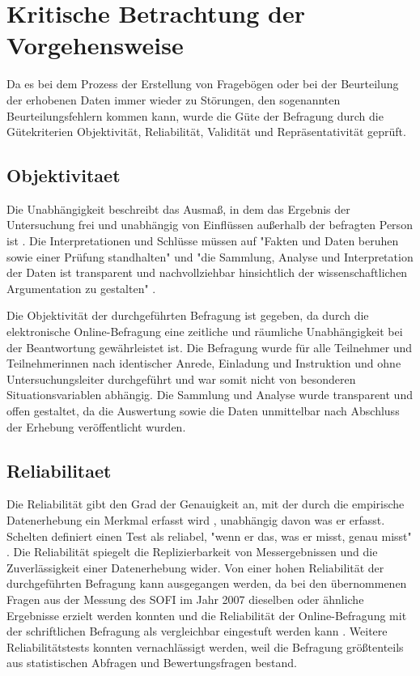 \section{Kritische Betrachtung der Vorgehensweise}

Da es bei dem Prozess der Erstellung von Fragebögen oder bei der Beurteilung der erhobenen Daten immer wieder zu Störungen, den sogenannten Beurteilungsfehlern kommen kann, wurde die Güte der Befragung durch die Gütekriterien Objektivität, Reliabilität, Validität und Repräsentativität geprüft.

\subsection{Objektivitaet}

Die Unabhängigkeit beschreibt das Ausmaß, in dem das Ergebnis der Untersuchung frei und unabhängig von Einflüssen außerhalb der befragten Person ist \cite{rost_2004_lehrbuch}. Die Interpretationen und Schlüsse müssen auf "Fakten und Daten beruhen sowie einer Prüfung standhalten" und "die Sammlung, Analyse und Interpretation der Daten ist transparent und nachvollziehbar hinsichtlich der wissenschaftlichen Argumentation zu gestalten" \cite{Bargheer_2015}.

Die Objektivität der durchgeführten Befragung ist gegeben, da durch die elektronische Online-Befragung eine zeitliche und räumliche Unabhängigkeit bei der Beantwortung gewährleistet ist. Die Befragung wurde für alle Teilnehmer und Teilnehmerinnen nach identischer Anrede, Einladung und Instruktion und ohne Untersuchungsleiter durchgeführt und war somit nicht von besonderen Situationsvariablen abhängig. Die Sammlung und Analyse wurde transparent und offen gestaltet, da die Auswertung sowie die Daten unmittelbar nach Abschluss der Erhebung veröffentlicht wurden.

\subsection{Reliabilitaet}

Die Reliabilität gibt den Grad der Genauigkeit an, mit der durch die empirische Datenerhebung ein Merkmal erfasst wird \cite{rost_2004_lehrbuch}, unabhängig davon was er erfasst. Schelten definiert einen Test als reliabel, "wenn er das, was er misst, genau misst" \cite{schelten_1997_testbeurteilung}. Die Reliabilität spiegelt die Replizierbarkeit von Messergebnissen und die Zuverlässigkeit einer Datenerhebung wider. Von einer hohen Reliabilität der durchgeführten Befragung kann ausgegangen werden, da bei den übernommenen Fragen aus der Messung des SOFI im Jahr 2007 dieselben oder ähnliche Ergebnisse erzielt werden konnten und die Reliabilität der Online-Befragung mit der schriftlichen Befragung als vergleichbar eingestuft werden kann \cite{Batinic_2003}. Weitere Reliabilitätstests konnten vernachlässigt werden, weil die Befragung größtenteils aus statistischen Abfragen und Bewertungsfragen bestand.

